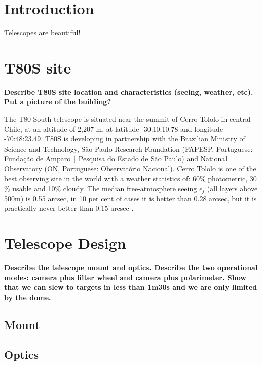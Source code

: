 \documentclass[12pt,preprint]{aastex}
\begin{document}


\section{Introduction}

Telescopes are beautiful! \citep{Benitez.etal.2014a}


\section{T80S site}

{\bf \color{red} Describe T80S site location and characteristics (seeing, weather, etc). Put a picture of the building?}

The T80-South telescope is situated near the summit of Cerro Tololo in central Chile, at an altitude of 2,207 m, at latitude -30:10:10.78 and longitude -70:48:23.49. T80S  is
developing in partnership with the Brazilian Ministry of Science and Technology, S\~ao Paulo Research Foundation (FAPESP, Portuguese: Funda\c c\~ao de Amparo ‡ Pesquisa do Estado de S\~ao Paulo) and National Observatory (ON, Portuguese: Observat\'orio Nacional). Cerro Tololo is one of the best observing site in the world with a weather statistics of: 60$\%$ photometric, 30$\%$ usable and 10$\%$ cloudy. The median free-atmosphere seeing $\epsilon_f$ (all layers above 500m) is 0.55 arcsec, in 10 per cent of cases it is better than 0.28
arcsec, but it is practically never better than 0.15 arcsec \citep{Tokovinin.Baumont.Vasquez.2003a}.


\section{Telescope Design}
{\bf \color{red} Describe the telescope mount and optics. Describe the two operational modes: camera plus filter wheel and camera plus polarimeter. Show that we can slew to targets in less than 1m30s and we are only limited by the dome.}

\subsection{Mount}

\subsection{Optics}
\end{document}
